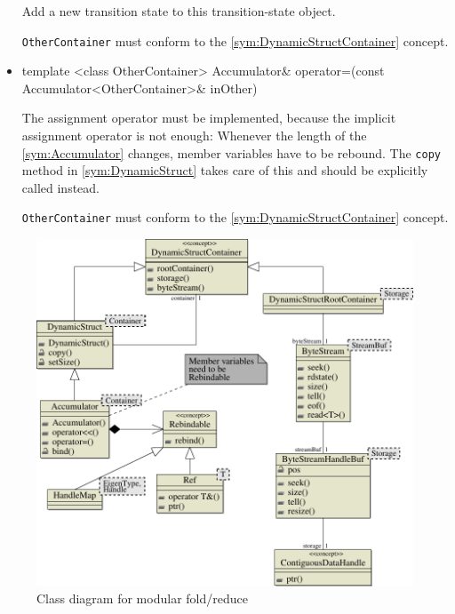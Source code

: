 \begin{itemize}
		Add a new transition state to this transition-state object.

		\texttt{OtherContainer} must conform to the \ref{sym:DynamicStructContainer} concept.

	\item
		\begin{cppsnippet}
		template <class OtherContainer>
		Accumulator& operator=(const Accumulator<OtherContainer>& inOther)
		\end{cppsnippet}

		The assignment operator must be implemented, because the implicit assignment operator is not enough: Whenever the length of the \ref{sym:Accumulator} changes, member variables have to be rebound. The \texttt{copy} method in \ref{sym:DynamicStruct} takes care of this and should be explicitly called instead.

		\texttt{OtherContainer} must conform to the \ref{sym:DynamicStructContainer} concept.
\end{itemize}

\begin{figure}
\begin{center}
\includegraphics[width=1.1\textwidth]{figures/class_diagram-1}
\end{center}
\caption{Class diagram for modular fold/reduce}
\end{figure}
